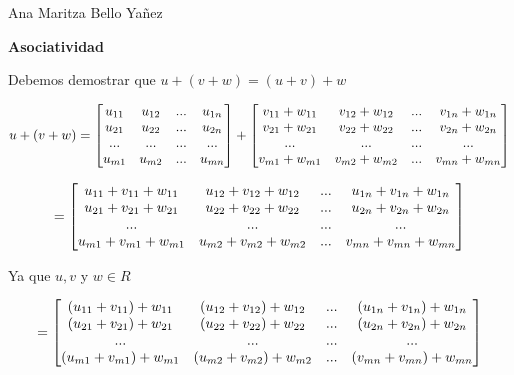 \documentclass[12pt]{article}
\begin{document}
Ana Maritza Bello Yañez

\textbf{Asociatividad}

Debemos demostrar que $u+(v+w)=(u+v)+w$

\begin{equation}\notag
    u+(v+w) =
    \begin{bmatrix}
        u_{11}  & u_{12} & ... & u_{1n} \\
        u_{21}  & u_{22} & ... & u_{2n} \\
        ...  & ... & ... & ... \\
        u_{m1}  & u_{m2} & ... & u_{mn} 
      \end{bmatrix} +
      \begin{bmatrix}
        v_{11} + w_{11}  & v_{12}+w_{12} & ... & v_{1n}+w_{1n} \\
        v_{21} + w_{21}  & v_{22}+w_{22} & ... & v_{2n}+w_{2n} \\
        ... & ... & ... &... \\       
        v_{m1} + w_{m1}  & v_{m2}+w_{m2} & ... & v_{mn}+w_{mn} 
      \end{bmatrix}
\end{equation}

\begin{equation}\notag
    =
    \begin{bmatrix}
        u_{11} + v_{11} + w_{11}  & u_{12} + v_{12}+w_{12} & ... & u_{1n} + v_{1n}+w_{1n} \\
        u_{21} + v_{21} + w_{21}  & u_{22} + v_{22}+w_{22} & ... & u_{2n} + v_{2n}+w_{2n} \\
        ... & ... & ... &... \\       
        u_{m1} + v_{m1} + w_{m1}  & u_{m2}+v_{m2}+w_{m2} & ... & v_{mn} + v_{mn}+w_{mn} 
      \end{bmatrix}
\end{equation}

Ya que $u,v$ y $w \in R$

\begin{equation}\notag
    =
    \begin{bmatrix}
        (u_{11} + v_{11}) + w_{11}  & (u_{12} + v_{12}) + w_{12} & ... & (u_{1n} + v_{1n}) + w_{1n} \\
        (u_{21} + v_{21}) + w_{21}  & (u_{22} + v_{22}) + w_{22} & ... & (u_{2n} + v_{2n}) + w_{2n} \\
        ... & ... & ... &... \\       
        (u_{m1} + v_{m1}) + w_{m1}  & (u_{m2} + v_{m2}) + w_{m2} & ... & (v_{mn} + v_{mn}) + w_{mn} 
      \end{bmatrix}
\end{equation}
\end{document}
